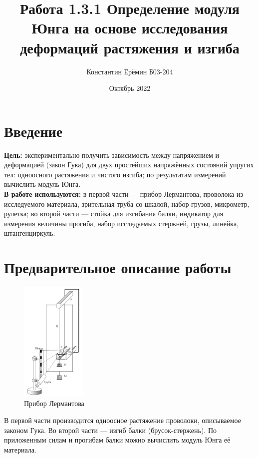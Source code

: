 \documentclass[a4paper, 10pt]{article}
\title{\textbf{Работа 1.3.1} \linebreak Определение модуля Юнга на основе исследования деформаций растяжения и изгиба}
\author{Константин Ерёмин Б03-204}
\date{Октябрь 2022}
\begin{document}
	\maketitle
	
	\section{Введение}
		\textbf{Цель:} экспериментально получить зависимость между напряжением и деформацией (закон Гука) для двух простейших напряжённых состояний упругих тел: одноосного растяжения и чистого изгиба; по результатам измерений вычислить модуль Юнга. \\
		
		\textbf{В работе используются:} в первой части --- прибор Лермантова, проволока из исследуемого материала, зрительная труба со шкалой, набор грузов, микрометр, рулетка; во второй части --- стойка для изгибания балки, индикатор для измерения величины прогиба, набор исследуемых стержней, грузы, линейка, штангенциркуль.
	
	\section{Предварительное описание работы}
	
		\begin{figure}
			\includegraphics[width=0.28\textwidth]{lermantov}
			\caption{Прибор Лермантова}
			\label{fig:lermantov}
		\end{figure}
		В первой части производится одноосное растяжение проволоки, описываемое законом Гука. Во второй части --- изгиб балки (брусок-стержень). По приложенным силам и прогибам балки можно вычислить модуль Юнга её материала.
		
\end{document}
